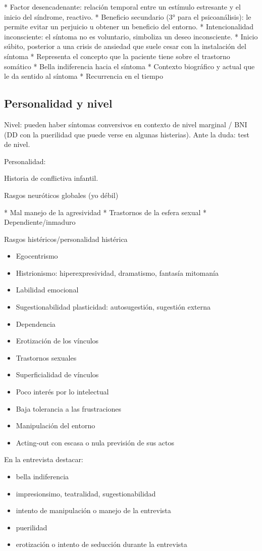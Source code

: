 * Factor desencadenante: relación temporal entre un estímulo estresante y el inicio del síndrome, reactivo.
* Beneficio secundario (3° para el psicoanálisis): le permite evitar un perjuicio u obtener un beneficio del entorno.
* Intencionalidad inconsciente: el síntoma no es voluntario, simboliza un deseo inconsciente.
* Inicio súbito, posterior a una crisis de ansiedad que suele cesar con la instalación del síntoma
* Representa el concepto que la paciente tiene sobre el trastorno somático
* Bella indiferencia hacia el síntoma
* Contexto biográfico y actual que le da sentido al síntoma
* Recurrencia en el tiempo

\subsection*{Personalidad y nivel}
Nivel: pueden haber síntomas conversivos en contexto de nivel marginal / BNI (DD con la puerilidad que puede verse en algunas histerias). Ante la duda: test de nivel.

Personalidad:

Historia de conflictiva infantil.

Rasgos neuróticos globales (yo débil)

* Mal manejo de la agresividad
* Trastornos de la esfera sexual
* Dependiente/inmaduro

Rasgos histéricos/personalidad histérica
\begin{itemize}
	\item Egocentrismo
	\item Histrionismo: hiperexpresividad, dramatismo, fantasía mitomanía
	\item Labilidad emocional
	\item Sugestionabilidad plasticidad: autosugestión, sugestión externa
	\item Dependencia
	\item Erotización de los vínculos
	\item Trastornos sexuales
	\item Superficialidad de vínculos
	\item Poco interés por lo intelectual
	\item Baja tolerancia a las frustraciones
	\item Manipulación del entorno
	\item Acting-out con escasa o nula previsión de sus actos
\end{itemize}

En la entrevista destacar:
\begin{itemize}
	\item bella indiferencia
	\item impresionsimo, teatralidad, sugestionabilidad
	\item intento de manipulación o manejo de la entrevista
	\item puerilidad
	\item erotización o intento de seducción durante la entrevista
\end{itemize}

